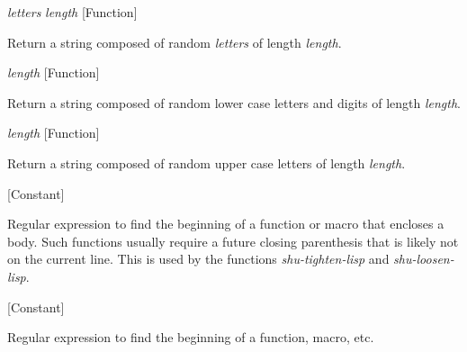 \vspace{1em}
\noindent
{}
\usebox{\funcname}\emph{letters} \emph{length}
 \hfill [Function]

\begin{doc-string}
Return a string composed of random \emph{letters} of length \emph{length}.
\end{doc-string}

\vspace{1em}
\noindent
{}
\usebox{\funcname}\emph{length}
 \hfill [Function]

\begin{doc-string}
Return a string composed of random lower case letters and digits of length
 \emph{length}.
\end{doc-string}

\vspace{1em}
\noindent
{}
\usebox{\funcname}\emph{length}
 \hfill [Function]

\begin{doc-string}
Return a string composed of random upper case letters of length \emph{length}.
\end{doc-string}

\vspace{1em}
\noindent
{}
\usebox{\funcname}
 \hfill [Constant]

\begin{doc-string}
Regular expression to find the beginning of a function or macro that encloses
a body.  Such functions usually require a future closing parenthesis that is
likely not on the current line.  This is used by the functions \emph{shu-tighten-lisp}
and \emph{shu-loosen-lisp}.
\end{doc-string}

\vspace{1em}
\noindent
{}
\usebox{\funcname}
 \hfill [Constant]

\begin{doc-string}
Regular expression to find the beginning of a function, macro, etc.
\end{doc-string}

